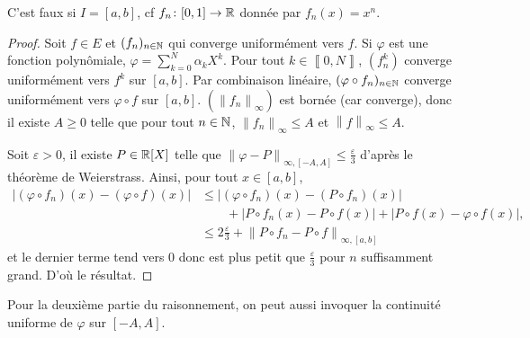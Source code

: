 \documentclass[12pt]{article}
\begin{document}
\begin{remark}
    C'est faux si $I=[a,b]$, cf $f_n\colon[0,1]\to\mathbb{R}$ donnée par $f_n(x)=x^{n}$.
\end{remark}

\begin{proof}
    Soit $f\in E$ et $(f_{n})_{n\in\mathbb{N}}$ qui converge uniformément vers $f$. Si $\varphi$ est une fonction polynômiale, $\varphi=\sum_{k=0}^{N}\alpha_{k}X^{k}$. Pour tout $k\in\left\llbracket0,N\right\rrbracket$, $(f_{n}^{k})$ converge uniformément vers $f^{k}$ sur $[a,b]$. Par combinaison linéaire, $(\varphi\circ f_{n})_{n\in\mathbb{N}}$ converge uniformément vers $\varphi\circ f$ sur $[a,b]$. $\left(\left\lVert f_n\right\rVert_{\infty}\right)$ est bornée (car converge), donc il existe $A\geqslant0$ telle que pour tout $n\in\mathbb{N}$, $\left\lVert f_n\right\rVert_{\infty}\leqslant A$ et $\left\lVert f\right\rVert_{\infty}\leqslant A$. 

    Soit $\varepsilon>0$, il existe $P\in\mathbb{R}[X]$ telle que $\left\lVert\varphi-P\right\rVert_{\infty,[-A,A]}\leqslant\frac{\varepsilon}{3}$ d'après le théorème de Weierstrass. Ainsi, pour tout $x\in[a,b]$,
    \begin{align*}
        \left\lvert\left(\varphi\circ f_n\right)(x)-\left(\varphi\circ f\right)(x)\right\rvert 
        &\leqslant\left\lvert\left(\varphi\circ f_n\right)(x)-\left(P\circ f_n\right)(x)\right\rvert\\
        &\qquad+\left\lvert P\circ f_n(x)-P\circ f(x)\right\rvert+\left\lvert P\circ f(x)-\varphi\circ f(x)\right\rvert,\\
        &\leqslant2\frac{\varepsilon}{3}+\left\lVert P\circ f_n-P\circ f\right\rVert_{\infty,[a,b]}
    \end{align*}
    et le dernier terme tend vers 0 donc est plus petit que $\frac{\varepsilon}{3}$ pour $n$ suffisamment grand. D'où le résultat.
\end{proof}

\begin{remark}
    Pour la deuxième partie du raisonnement, on peut aussi invoquer la continuité uniforme de $\varphi$ sur $[-A,A]$.
\end{remark}
\end{document}

